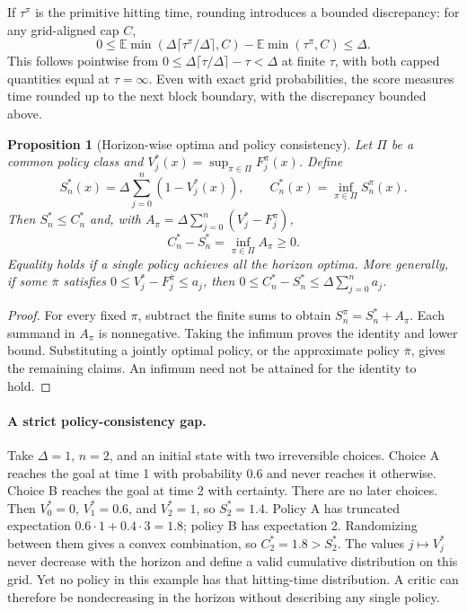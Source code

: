 \documentclass{article}
\newcommand{\EE}{\mathbb E}
\newtheorem{proposition}[theorem]{Proposition}
\theoremstyle{definition}
\theoremstyle{remark}
\begin{document}
If $\tau^\pi$ is the primitive hitting time, rounding introduces a bounded discrepancy:
for any grid-aligned cap $C$,
\[
 0\le
 \EE\min(\Delta\lceil\tau^\pi/\Delta\rceil,C)
       -\EE\min(\tau^\pi,C)
 \le\Delta.
\]
This follows pointwise from $0\le\Delta\lceil\tau/\Delta\rceil-\tau<\Delta$ at
finite $\tau$, with both capped quantities equal at $\tau=\infty$.
Even with exact grid probabilities, the score measures time rounded up to the next
block boundary, with the discrepancy bounded above.

\begin{proposition}[Horizon-wise optima and policy consistency]
\label{prop:policy-consistency}
Let $\Pi$ be a common policy class and
$V_j^*(x)=\sup_{\pi\in\Pi}F_j^\pi(x)$.
Define
\[
 S_n^*(x)=\Delta\sum_{j=0}^{n}(1-V_j^*(x)),\qquad
 C_n^*(x)=\inf_{\pi\in\Pi}S_n^\pi(x).
\]
Then $S_n^*\le C_n^*$ and, with $A_\pi=\Delta\sum_{j=0}^{n}(V_j^*-F_j^\pi)$,
\begin{equation}
 C_n^*-S_n^*=\inf_{\pi\in\Pi} A_\pi\ge0.
 \label{eq:consistency-gap}
\end{equation}
Equality holds if a single policy achieves all the horizon optima.
More generally, if some $\bar\pi$ satisfies
$0\le V_j^*-F_j^{\bar\pi}\le a_j$, then
$0\le C_n^*-S_n^*\le\Delta\sum_{j=0}^{n}a_j$.
\end{proposition}
\begin{proof}
For every fixed $\pi$, subtract the finite sums to obtain
$S_n^\pi=S_n^*+A_\pi$. Each summand in $A_\pi$ is nonnegative.
Taking the infimum proves the identity and lower bound. Substituting a jointly
optimal policy, or the approximate policy $\bar\pi$, gives the remaining claims.
An infimum need not be attained for the identity to hold.
\end{proof}

\paragraph{A strict policy-consistency gap.}
Take $\Delta=1$, $n=2$, and an initial state with two irreversible choices.
Choice A reaches the goal at time 1 with probability 0.6 and never reaches it otherwise.
Choice B reaches the goal at time 2 with certainty. There are no later choices.
Then $V_0^*=0$, $V_1^*=0.6$, and $V_2^*=1$, so $S_2^*=1.4$.
Policy A has truncated expectation $0.6\cdot1+0.4\cdot3=1.8$;
policy B has expectation 2. Randomizing between them gives a convex combination,
so $C_2^*=1.8>S_2^*$.
The values $j\mapsto V_j^*$ never decrease with the horizon and define a valid cumulative
distribution on this grid. Yet no policy in this example has that hitting-time distribution.
A critic can therefore be nondecreasing in the horizon without describing any single policy.
\end{document}
